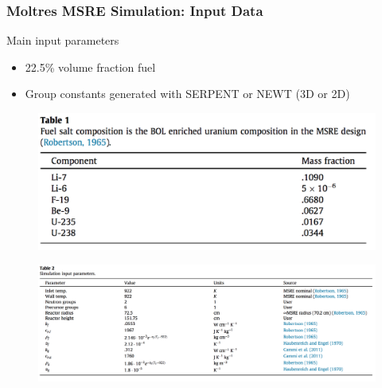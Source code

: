 \begin{frame}
  \frametitle{Moltres MSRE Simulation: Input Data}
     \begin{block}{Main input parameters \cite{lindsay_moltres_2017}}
     	\begin{itemize}
     		\item 22.5\% volume fraction fuel
     		\item Group constants generated with SERPENT or NEWT (3D or 2D)
     	\end{itemize}
              \begin{figure}[t]
                 \vspace*{-0.15in}
                 \hspace*{-2.0in}
                \includegraphics[height=0.2\textwidth]{./images/moltres-composition.png}
               \end{figure}     
               \begin{figure}[t]
                 \vspace*{-0.25in}
                \includegraphics[height=0.33\textwidth]{./images/moltres-input.png}
               \end{figure}   

	\end{block}
	
\end{frame}
